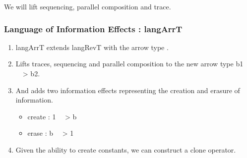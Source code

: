 \documentclass[svgnames,11pt]{beamer}
\newcommand{\red}[1]{{\color{red}{#1}}}
\begin{document}
\begin{frame}
We will lift sequencing, parallel composition and trace. 


\end{frame}

\begin{frame}
\frametitle{Language of Information Effects : {{langArrT}} }

\vfill


\begin{enumerate}
\item {{langArrT}} extends {{langRevT}} with the arrow type \red{
    {{a:b1~~>b2}} }.

\vfill
\pause
\item Lifts traces, sequencing and parallel composition to the new
  arrow type {{b1 ~~> b2}}.

\pause
\vfill
\item And adds two information effects representing the creation and
  erasure of information.
  \begin{itemize}
  \item {{create : 1 ~~> b}}
  \item {{erase : b ~~> 1}}
  \end{itemize}

\vfill
  \item Given the ability to {{create}} constants, we can construct a
    {{clone}} operator.

\end{enumerate}


\vfill

\end{frame}


\begin{frame}
  
    \begin{center}
    \end{center}


\end{frame}
\end{document}
